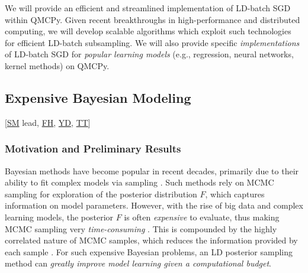 \documentclass[11pt]{NSFamsart}
\newcommand{\cmtS}[1]{{\color{blue}{(Simon: #1)}}}
\newcommand{\FH}{\hyperlink{FHlink}{FH}\xspace}
\newcommand{\SM}{\hyperlink{SMlink}{SM}\xspace}
\newcommand{\TT}{\hyperlink{TTlink}{TT}\xspace}
\newcommand{\YD}{\hyperlink{YDlink}{YD}\xspace}
\begin{document}
\cmtS{move later} We will provide an efficient and streamlined implementation of LD-batch SGD within QMCPy. Given recent breakthroughs in high-performance and distributed computing, we will develop scalable algorithms which exploit such technologies for efficient LD-batch subsampling. We will also provide specific \textit{implementations} of LD-batch SGD for \textit{popular learning models} (e.g., regression, neural networks, kernel methods) on QMCPy.


\subsection{Expensive Bayesian Modeling} [\SM lead, \FH, \YD, \TT{}] \label{sec:bayes}

\subsubsection{Motivation and Preliminary Results}
Bayesian methods have become popular in recent decades, primarily due to their ability to fit complex models via sampling \cite{GelEtal13}. Such methods rely on MCMC sampling for exploration of the posterior distribution $F$, which captures information on model parameters. However, with the rise of big data and complex learning models, the posterior $F$ is often \textit{expensive} to evaluate, thus making MCMC sampling very \textit{time-consuming} \cite{joseph2015sequential}. This is compounded by the highly correlated nature of MCMC samples, which reduces the information provided by each sample \citep{link2012thinning}. For such expensive Bayesian problems, an LD posterior sampling method can \textit{greatly improve model learning given a computational budget}.

\end{document}
